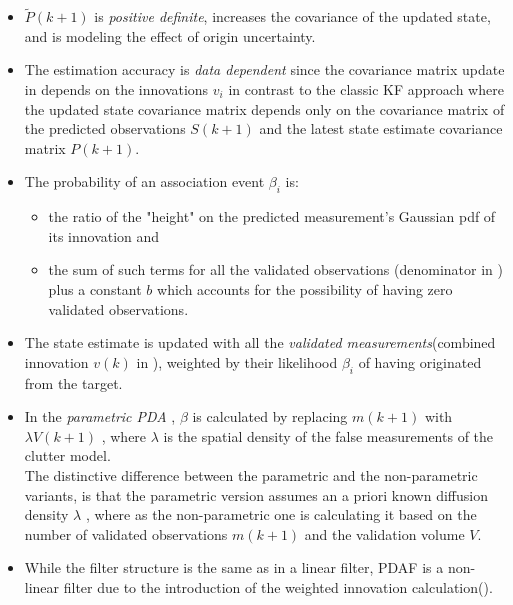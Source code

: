\begin{itemize}
	\item $\tilde{P}(k+1)$ is \emph{positive definite}, increases the covariance of the updated state, and is modeling the effect of origin uncertainty.
	\item The estimation accuracy is \emph{data dependent} since the covariance matrix update in  depends on the innovations $v_i$ in contrast to the classic KF approach where the updated state covariance matrix depends only on the covariance matrix of the predicted observations $S(k+1)$ and the latest state estimate covariance matrix $P(k+1)$.
	\item The probability of an association event $\beta_i$ is:
	\begin{itemize}
		\item the ratio of the "height" on the predicted measurement's Gaussian pdf of its innovation and
		\item the sum of such terms for all the validated observations (denominator in ) plus a constant $b$ which accounts for the possibility of having zero validated observations.
	\end{itemize}
	\item The state estimate is updated with all the \emph{validated measurements}(combined innovation $v(k)$ in ), weighted by their likelihood $\beta_i$ of having originated from the target.
	\item In the \emph{parametric PDA} , $\beta$ is calculated by replacing $m(k+1)$ with $\lambda V(k+1)$ , where $\lambda$ is the spatial density of the false measurements of the clutter model. \\
	
	The distinctive difference between the parametric and the non-parametric variants, is that the parametric version assumes an a priori known diffusion density $\lambda$ , where as the non-parametric one is calculating it based on the number of validated observations $m(k+1)$ and the validation volume $V$.
	
	\item While the filter structure is the same as in a linear filter, PDAF is a non-linear filter due to the introduction of the weighted innovation calculation().
\end{itemize}


